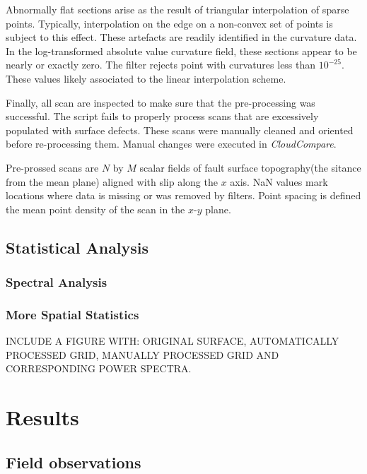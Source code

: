 \documentclass[12pt,a4paper]{article}
\begin{document}
Abnormally flat sections arise as the result of triangular interpolation of sparse points. Typically, interpolation on the edge on a non-convex set of points is subject to this effect. These artefacts are readily identified in the curvature data. In the log-transformed absolute value curvature field, these sections appear to be nearly or exactly zero. The filter rejects point with curvatures less than $10^{-25}$. These values likely associated to the linear interpolation scheme.

Finally, all scan are inspected to make sure that the pre-processing was successful. The script fails to properly process scans that are excessively populated with surface defects. These scans were manually cleaned and oriented before re-processing them. Manual changes were executed in \textit{CloudCompare}. 

Pre-prossed scans are $N$ by $M$ scalar fields of fault surface topography(the sitance from the mean plane) aligned with slip along the $x$ axis. NaN values mark locations where data is missing or was removed by filters. Point spacing is defined the mean point density of the scan in the $x$-$y$ plane.
	\subsection{Statistical Analysis}
		

		\subsubsection{Spectral Analysis}
		

		\subsubsection{More Spatial Statistics}
	

INCLUDE A FIGURE WITH: ORIGINAL SURFACE, AUTOMATICALLY PROCESSED GRID, MANUALLY PROCESSED GRID AND CORRESPONDING POWER SPECTRA.

\section{Results}

	\subsection{Field observations}
	
\end{document}
